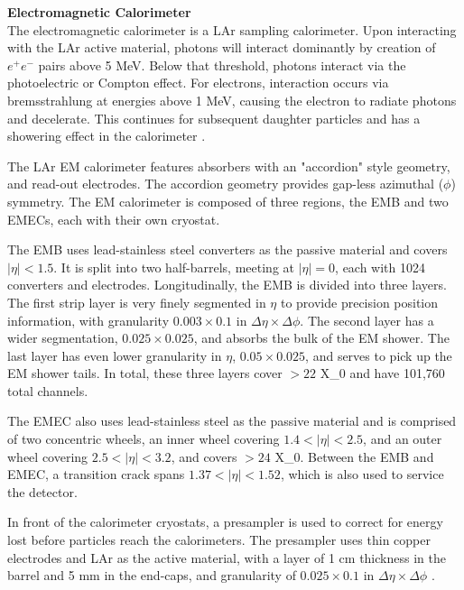 \noindent\textbf{Electromagnetic Calorimeter}\\
\indent The electromagnetic calorimeter is a \gls{LAr} sampling calorimeter. Upon interacting with the \gls{LAr} active material, photons will interact dominantly by creation of $e^+e^-$ pairs above 5 MeV. Below that threshold, photons interact via the photoelectric or Compton effect. For electrons, interaction occurs via bremsstrahlung at energies above 1 MeV, causing the electron to radiate photons and decelerate. This continues for subsequent daughter particles and has a showering effect in the calorimeter \cite{detectors-for-radiation}.

The \gls{LAr} \gls{EM} calorimeter features absorbers with an "accordion" style geometry, and read-out electrodes. The accordion geometry provides gap-less azimuthal ($\phi$) symmetry. The \gls{EM} calorimeter is composed of three regions, the \gls{EMB} and two \glspl{EMEC}, each with their own cryostat. 
    
The \gls{EMB} uses lead-stainless steel converters as the passive material and covers $|\eta| < 1.5$. It is split into two half-barrels, meeting at $|\eta| = 0$, each with 1024 converters and electrodes. Longitudinally, the \gls{EMB} is divided into three layers. The first strip layer is very finely segmented in $\eta$ to provide precision position information, with granularity $0.003 \times 0.1$ in $\Delta\eta \times \Delta \phi$. The second layer has a wider segmentation, $0.025 \times 0.025$, and absorbs the bulk of the \gls{EM} shower. The last layer has even lower granularity in $\eta$, $0.05 \times 0.025$, and serves to pick up the \gls{EM} shower tails. In total, these three layers cover $>22$ \gls{X_0} and have 101,760 total channels.

The \gls{EMEC} also uses lead-stainless steel as the passive material and is comprised of two concentric wheels, an inner wheel covering $1.4 < |\eta| < 2.5$, and an outer wheel covering $2.5 < |\eta| < 3.2$, and covers $>24$ \gls{X_0}. Between the \gls{EMB} and \gls{EMEC}, a transition crack spans $1.37 < |\eta| < 1.52$, which is also used to service the detector. 

In front of the calorimeter cryostats, a presampler is used to correct for energy lost before particles reach the calorimeters. The presampler uses thin copper electrodes and \gls{LAr} as the active material, with a layer of 1 cm thickness in the barrel and 5 mm in the end-caps, and granularity of $0.025 \times 0.1$ in $\Delta\eta \times \Delta \phi$ \cite{lar-tdr}.


